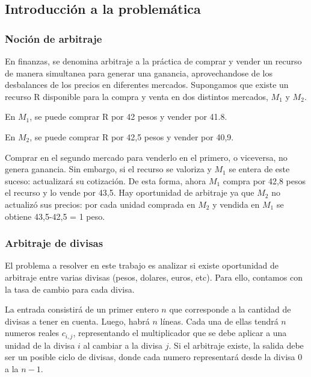\subsection{Introducción a la problemática}

\subsubsection{Noción de arbitraje}
En finanzas, se denomina arbitraje a la práctica de comprar y vender un recurso de manera simultanea para generar una ganancia, aprovechandose de los desbalances de los precios en diferentes mercados. Supongamos que existe un recurso R disponible para la compra y venta en dos distintos mercados, $M_{1}$ y $M_{2}$.
 \par
En $M_{1}$, se puede comprar R por 42 pesos y vender por 41.8.
 \par
En $M_{2}$, se puede comprar R por 42,5 pesos y vender por 40,9.
 \par
Comprar en el segundo mercado para venderlo en el primero, o viceversa, no genera ganancia. Sin embargo, si el recurso se valoriza y $M_{1}$ se entera de este suceso: actualizará su cotización. De esta forma, ahora $M_{1}$ compra por 42,8 pesos el recurso y lo vende por 43,5. Hay oportunidad de arbitraje ya que $M_{2}$ no actualizó sus precios: por cada unidad comprada en $M_{2}$ y vendida en $M_{1}$ se obtiene 43,5-42,5 = 1 peso. 

\subsubsection{Arbitraje de divisas}
El problema a resolver en este trabajo es analizar si existe oportunidad de arbitraje entre varias divisas (pesos, dolares, euros, etc). Para ello, contamos con la tasa de cambio para cada divisa.

La entrada consistirá de un primer entero $n$ que corresponde a la cantidad de divisas a tener en cuenta. Luego, habrá $n$ líneas. Cada una de ellas tendrá $n$ numeros reales $c_{i,j}$, representando el multiplicador que se debe aplicar a una unidad de la divisa $i$ al cambiar a la divisa $j$. Si el arbitraje existe, la salida debe ser un posible ciclo de divisas, donde cada numero representará desde la divisa $0$ a la $n-1$.

